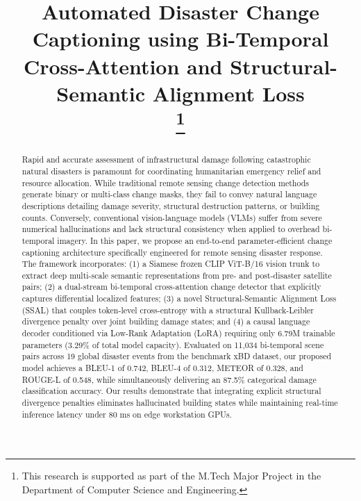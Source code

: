 \documentclass[conference]{IEEEtran}
\begin{document}
\title{Automated Disaster Change Captioning using Bi-Temporal Cross-Attention and Structural-Semantic Alignment Loss\\
\thanks{This research is supported as part of the M.Tech Major Project in the Department of Computer Science and Engineering.}
}

\author{
\and
{}
}

\maketitle

\begin{abstract}
Rapid and accurate assessment of infrastructural damage following catastrophic natural disasters is paramount for coordinating humanitarian emergency relief and resource allocation. While traditional remote sensing change detection methods generate binary or multi-class change masks, they fail to convey natural language descriptions detailing damage severity, structural destruction patterns, or building counts. Conversely, conventional vision-language models (VLMs) suffer from severe numerical hallucinations and lack structural consistency when applied to overhead bi-temporal imagery. In this paper, we propose an end-to-end parameter-efficient change captioning architecture specifically engineered for remote sensing disaster response. The framework incorporates: (1) a Siamese frozen CLIP ViT-B/16 vision trunk to extract deep multi-scale semantic representations from pre- and post-disaster satellite pairs; (2) a dual-stream bi-temporal cross-attention change detector that explicitly captures differential localized features; (3) a novel Structural-Semantic Alignment Loss (SSAL) that couples token-level cross-entropy with a structural Kullback-Leibler divergence penalty over joint building damage states; and (4) a causal language decoder conditioned via Low-Rank Adaptation (LoRA) requiring only 6.79M trainable parameters (3.29\% of total model capacity). Evaluated on 11,034 bi-temporal scene pairs across 19 global disaster events from the benchmark xBD dataset, our proposed model achieves a BLEU-1 of 0.742, BLEU-4 of 0.312, METEOR of 0.328, and ROUGE-L of 0.548, while simultaneously delivering an 87.5\% categorical damage classification accuracy. Our results demonstrate that integrating explicit structural divergence penalties eliminates hallucinated building states while maintaining real-time inference latency under 80 ms on edge workstation GPUs.
\end{abstract}
\end{document}

